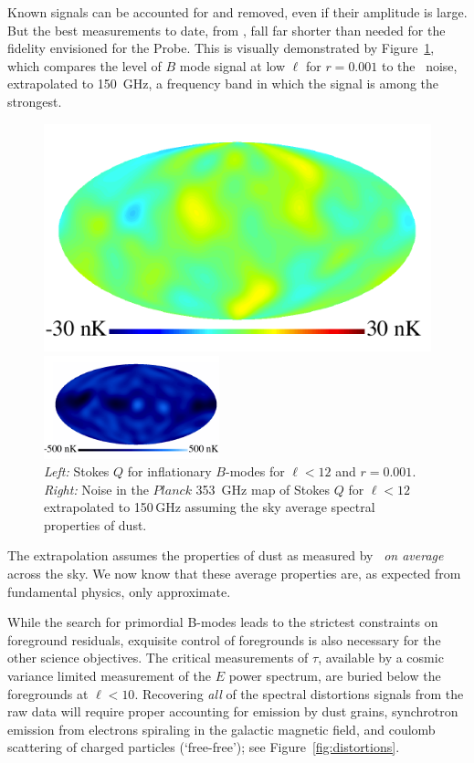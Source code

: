 Known signals can be accounted for and removed, even if their amplitude is large. 
But the best measurements to date, from \planck , fall far shorter than needed for the fidelity 
envisioned for the Probe. This is visually demonstrated by Figure~\ref{fig:Qrp001}, which 
compares the level of $B$ mode signal at low $\ell$ for $r = 0.001$ to the \planck\ noise, 
extrapolated to 150~GHz, a frequency band in which the signal is among the strongest. 
\begin{figure}[ht!]
\parbox{2.in}{\centerline {
\includegraphics[width=2.in]{Figures/P15_2_12_rp001.pdf} } }
\hspace{-.05in}
\parbox{2.0in}{\centerline { 
\includegraphics[width=2.0in]{Figures/P353_N_2_12.pdf} } }
\hspace{0.in}
\parbox{2.4in} { 
\caption{ \footnotesize \setlength{\baselineskip}{0.95\baselineskip}
{\it Left:} Stokes $Q$ for inflationary $B$-modes for $\ell<12$ and $r=0.001$. 
 {\it Right:} Noise in the $Planck$ 353~GHz map of Stokes $Q$ for $\ell<12$ 
 extrapolated to 150\,GHz assuming the sky average spectral properties of dust. 
\label{fig:Qrp001}  }  }
\vspace{-0.05in}
\end{figure}

The extrapolation assumes the properties of dust as measured by \planck\ {\it on average} across
the sky. We now know that these average properties are, as expected from fundamental physics, 
only approximate. 

While the search for primordial B-modes leads to the strictest constraints on foreground residuals, 
exquisite control of foregrounds is also necessary for the other science objectives. 
The critical measurements of $\tau$, available by a cosmic variance limited measurement of the $E$
power spectrum, are buried below the foregrounds at $\ell < 10$.  
Recovering {\it all} of the spectral distortions signals from the raw data will require proper accounting 
for emission by dust grains, synchrotron emission from electrons spiraling in the galactic magnetic 
field, and coulomb scattering of charged particles (`free-free'); see Figure~\ref{fig:distortions}.   



